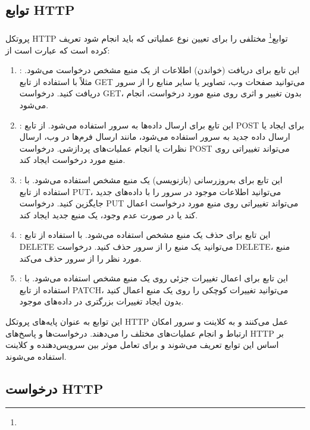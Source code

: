 \subsection{توابع HTTP}
\label{subsec:http_methods}
\paragraph{}
{
    پروتکل HTTP توابع\footnote{} مختلفی را برای تعیین نوع عملیاتی که باید انجام شود تعریف کرده است که عبارت است از:
    \begin{enumerate}
        \item {}: این تابع برای دریافت (خواندن) اطلاعات از یک منبع مشخص درخواست می‌شود. مثلاً با استفاده از تابع GET می‌توانید صفحات وب، تصاویر یا سایر منابع را از سرور دریافت کنید. درخواست GET، بدون تغییر و اثری روی منبع مورد درخواست، انجام می‌شود.
        \item {}: این تابع برای ارسال داده‌ها به سرور استفاده می‌شود. از تابع POST برای ایجاد یا ارسال داده جدید به سرور استفاده می‌شود، مانند ارسال فرم‌ها در وب، ارسال نظرات یا انجام عملیات‌های پردازشی. درخواست POST می‌تواند تغییراتی روی منبع مورد درخواست ایجاد کند.
        \item {}: این تابع برای به‌روزرسانی (بازنویسی) یک منبع مشخص استفاده می‌شود. با استفاده از تابع PUT، می‌توانید اطلاعات موجود در سرور را با داده‌های جدید جایگزین کنید. درخواست PUT می‌تواند تغییراتی روی منبع مورد درخواست اعمال کند یا در صورت عدم وجود، یک منبع جدید ایجاد کند.
        \item {}: این تابع برای حذف یک منبع مشخص استفاده می‌شود. با استفاده از تابع DELETE می‌توانید یک منبع را از سرور حذف کنید. درخواست DELETE، منبع مورد نظر را از سرور حذف می‌کند.
        \item {}: این تابع برای اعمال تغییرات جزئی روی یک منبع مشخص استفاده می‌شود. با استفاده از تابع PATCH، می‌توانید تغییرات کوچکی را روی یک منبع اعمال کنید بدون ایجاد تغییرات بزرگتری در داده‌های موجود.
    \end{enumerate}
    این توابع به عنوان پایه‌های پروتکل HTTP عمل می‌کنند و به کلاینت و سرور امکان ارتباط و انجام عملیات‌های مختلف را می‌دهند. درخواست‌ها و پاسخ‌های HTTP بر اساس این توابع تعریف می‌شوند و برای تعامل موثر بین سرویس‌دهنده و کلاینت استفاده می‌شوند.
}

\subsection{درخواست HTTP}
\label{subsec:http_requests}
